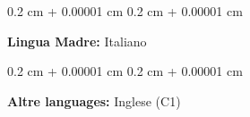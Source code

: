 \documentclass[10pt, letterpaper]{article}
\newenvironment{onecolentry}{
    \begin{adjustwidth}{
        0.2 cm + 0.00001 cm
    }{
        0.2 cm + 0.00001 cm
    }
}{
    \end{adjustwidth}
} %
\begin{document}
        \begin{onecolentry}
            \textbf{Lingua Madre:} Italiano
        \end{onecolentry}

        \vspace{0.2 cm}

        \begin{onecolentry}
            \textbf{Altre languages:} Inglese (C1)
        \end{onecolentry}

    
        
\end{document}
